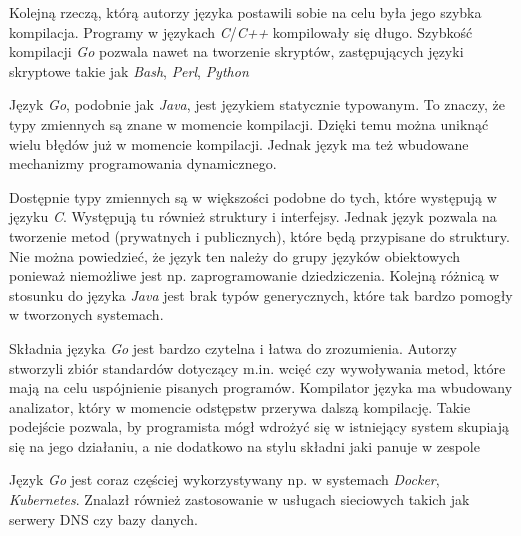 Kolejną rzeczą, którą autorzy języka postawili sobie na celu była jego szybka kompilacja. Programy w językach \textsl{C}/\textsl{C++} kompilowały się długo. Szybkość kompilacji \textsl{Go} pozwala nawet na tworzenie skryptów, zastępujących języki skryptowe takie jak \textsl{Bash}, \textsl{Perl}, \textsl{Python}

Język \textsl{Go}, podobnie jak \textsl{Java}, jest językiem statycznie typowanym. To znaczy, że typy zmiennych są znane w momencie kompilacji. Dzięki temu można uniknąć wielu błędów już w momencie kompilacji. Jednak język ma też wbudowane mechanizmy programowania dynamicznego. 

Dostępnie typy zmiennych są w większości podobne do tych, które występują w języku \textsl{C}. Występują tu również struktury i interfejsy. Jednak język pozwala na tworzenie metod (prywatnych i publicznych), które będą przypisane do struktury. Nie można powiedzieć, że język ten należy do grupy języków obiektowych ponieważ niemożliwe jest np. zaprogramowanie dziedziczenia. Kolejną różnicą w stosunku do języka \textsl{Java} jest brak typów generycznych, które tak bardzo pomogły w tworzonych systemach.
 
Składnia języka \textsl{Go} jest bardzo czytelna i łatwa do zrozumienia. Autorzy stworzyli zbiór standardów dotyczący m.in. wcięć czy wywoływania metod, które mają na celu uspójnienie pisanych programów. Kompilator języka ma wbudowany analizator, który w momencie odstępstw przerywa dalszą kompilację. Takie podejście pozwala, by programista mógł wdrożyć się w istniejący system skupiają się na jego działaniu, a nie dodatkowo na stylu składni jaki panuje w zespole

Język \textsl{Go} jest coraz częściej wykorzystywany np. w systemach  \textsl{Docker}, \textsl{Kubernetes}. Znalazł również zastosowanie w usługach sieciowych takich jak serwery DNS czy bazy danych.